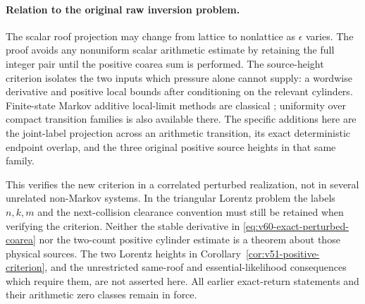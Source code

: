 \paragraph{Relation to the original raw inversion problem.}
The scalar roof projection may change from lattice to nonlattice as
$\epsilon$ varies. The proof avoids any nonuniform scalar arithmetic
estimate by retaining the full integer pair until the positive coarea
sum is performed. The source-height criterion isolates the two inputs
which pressure alone cannot supply: a wordwise derivative and positive
local bounds after conditioning on the relevant cylinders. Finite-state
Markov additive local-limit methods are classical \cite{HL,HLuniform};
uniformity over compact transition families is also available there.
The specific additions here are the joint-label projection across an
arithmetic transition, its exact deterministic endpoint overlap, and
the three original positive source heights in that same family.

This verifies the new criterion in a correlated perturbed realization,
not in several unrelated non-Markov systems. In the triangular Lorentz
problem the labels $n,k,m$ and the next-collision clearance convention
must still be retained when verifying the criterion. Neither the stable
derivative in \eqref{eq:v60-exact-perturbed-coarea} nor the two-count
positive cylinder estimate is a theorem about those physical sources.
The two Lorentz heights in Corollary~\ref{cor:v51-positive-criterion},
and the unrestricted same-roof and essential-likelihood consequences
which require them, are not asserted here. All earlier exact-return
statements and their arithmetic zero classes remain in force.
